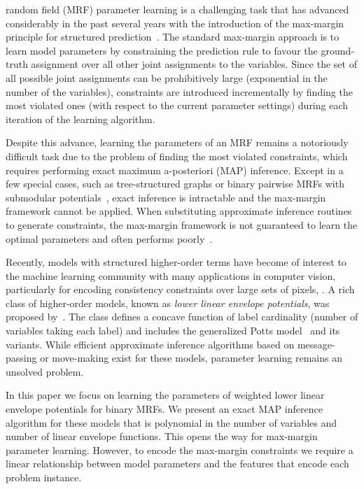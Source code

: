 \documentclass[10pt,journal,letterpaper,compsoc]{IEEEtran}
\renewcommand{\citename}{\citet}
\renewcommand{\cite}{\citep}
\begin{document}
 random field (MRF) parameter learning is a
challenging task that has advanced considerably in the past several
years with the introduction of the max-margin principle for structured
prediction~\cite{Tsochantaridis:ICML04, Taskar:ICML05}. The standard
max-margin approach is to learn model parameters by constraining the
prediction rule to favour the ground-truth assignment over all other
joint assignments to the variables. Since the set of all possible
joint assignments can be prohibitively large (exponential in the
number of the variables), constraints are introduced incrementally by
finding the most violated ones (with respect to the current parameter
settings) during each iteration of the learning algorithm.

Despite this advance, learning the parameters of an MRF remains a
notoriously difficult task due to the problem of finding the most
violated constraints, which requires performing exact maximum
a-posteriori (MAP) inference. Except in a few special cases, such as
tree-structured graphs or binary pairwise MRFs with submodular
potentials~\cite{Koller:2009}, exact inference is intractable and the
max-margin framework cannot be applied. When substituting approximate
inference routines to generate constraints, the max-margin framework
is not guaranteed to learn the optimal parameters and often performs
poorly~\cite{Finley:ICML08}.

Recently, models with structured higher-order terms have become of
interest to the machine learning community with many applications in
computer vision, particularly for encoding consistency constraints
over large sets of pixels, \eg \cite{Rother:CVPR09, Nowozin:CVPR09,
  Lempitsky:ICCV09}. A rich class of higher-order models, known as
\emph{lower linear envelope potentials}, was proposed
by~\citename{Kohli:CVPR10}. The class defines a concave function of
label cardinality (\ie number of variables taking each label) and
includes the generalized Potts model~\cite{Kohli:CVPR07} and its
variants. While efficient approximate inference algorithms based on
message-passing or move-making exist for these models, parameter
learning remains an unsolved problem.

In this paper we focus on learning the parameters of weighted lower
linear envelope potentials for binary MRFs. We present an exact MAP
inference algorithm for these models that is polynomial in the number
of variables and number of linear envelope functions. This opens the
way for max-margin parameter learning. However, to encode the
max-margin constraints we require a linear relationship between model
parameters and the features that encode each problem instance.
\end{document}
